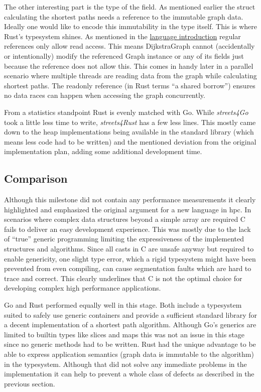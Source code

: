 The other interesting part is the type of the  field. As mentioned earlier the struct calculating the shortest paths needs a reference to the immutable graph data. Ideally one would like to encode this immutability in the type itself. This is where Rust's typesystem shines. As mentioned in the \hyperref[subsec:State_of_the_art::Candidates::Rust]{language introduction} regular references only allow read access. This means DijkstraGraph cannot (accidentally or intentionally) modify the referenced Graph instance or any of its fields just because the reference does not allow this. This comes in handy later in a parallel scenario where multiple threads are reading data from the graph while calculating shortest paths. The readonly reference (in Rust terms ``a shared borrow'') ensures no data races can happen when accessing the graph concurrently.

From a statistics standpoint Rust is evenly matched with Go. While \textit{streets4Go} took a little less time to write, \textit{streets4Rust} has a few less lines. This mostly came down to the heap implementations being available in the standard library (which means less code had to be written) and the mentioned deviation from the original implementation plan, adding some additional development time.

\subsection{Comparison}
\label{subsec:Implementation::Graph_Representation::Comparison}

Although this milestone did not contain any performance measurements it clearly highlighted and emphasized the original argument for a new language in \acrlong{hpc}. In scenarios where complex data structures beyond a simple array are required C fails to deliver an easy development experience. This was mostly due to the lack of ``true'' generic programming limiting the expressiveness of the implemented structures and algorithms. Since all casts in C are unsafe anyway but required to enable genericity, one slight type error, which a rigid typesystem might have been prevented from even compiling, can cause segmentation faults which are hard to trace and correct. This clearly underlines that C is not the optimal choice for developing complex high performance applications.

Go and Rust performed equally well in this stage. Both include a typesystem suited to safely use generic containers and provide a sufficient standard library for a decent implementation of a shortest path algorithm. Although Go's generics are limited to builtin types like slices and maps this was not an issue in this stage since no generic methods had to be written. Rust had the unique advantage to be able to express application semantics (graph data is immutable to the algorithm) in the typesystem. Although that did not solve any immediate problems in the implementation it can help to prevent a whole class of defects as described in the previous section.

